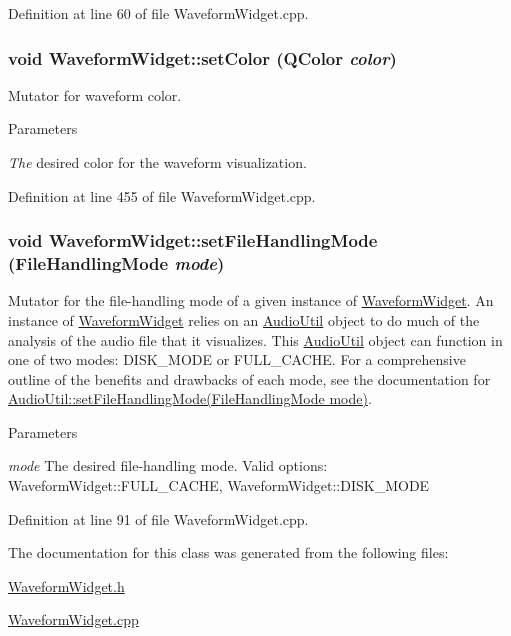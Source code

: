 Definition at line 60 of file WaveformWidget.cpp.\hypertarget{classWaveformWidget_a51a16e62c5e5deae1a4fd4073dedab2d}{
\subsubsection[{setColor}]{\setlength{\rightskip}{0pt plus 5cm}void WaveformWidget::setColor (QColor {\em color})}}
\label{classWaveformWidget_a51a16e62c5e5deae1a4fd4073dedab2d}


Mutator for waveform color. 
\begin{DoxyParams}{Parameters}
\item[{\em The}]desired color for the waveform visualization. \end{DoxyParams}


Definition at line 455 of file WaveformWidget.cpp.\hypertarget{classWaveformWidget_a65b983a6c1a6325b3cf84b8ae6fa8a69}{
\subsubsection[{setFileHandlingMode}]{\setlength{\rightskip}{0pt plus 5cm}void WaveformWidget::setFileHandlingMode (FileHandlingMode {\em mode})}}
\label{classWaveformWidget_a65b983a6c1a6325b3cf84b8ae6fa8a69}


Mutator for the file-\/handling mode of a given instance of \hyperlink{classWaveformWidget}{WaveformWidget}. An instance of \hyperlink{classWaveformWidget}{WaveformWidget} relies on an \hyperlink{classAudioUtil}{AudioUtil} object to do much of the analysis of the audio file that it visualizes. This \hyperlink{classAudioUtil}{AudioUtil} object can function in one of two modes: DISK\_\-MODE or FULL\_\-CACHE. For a comprehensive outline of the benefits and drawbacks of each mode, see the documentation for \hyperlink{classAudioUtil_aa6e29dfd59fb16462f5ee00ce7c311db}{AudioUtil::setFileHandlingMode(FileHandlingMode mode)}.


\begin{DoxyParams}{Parameters}
\item[{\em mode}]The desired file-\/handling mode. Valid options: WaveformWidget::FULL\_\-CACHE, WaveformWidget::DISK\_\-MODE \end{DoxyParams}


Definition at line 91 of file WaveformWidget.cpp.

The documentation for this class was generated from the following files:\begin{DoxyCompactItemize}
\item 
\hyperlink{WaveformWidget_8h}{WaveformWidget.h}\item 
\hyperlink{WaveformWidget_8cpp}{WaveformWidget.cpp}\end{DoxyCompactItemize}
